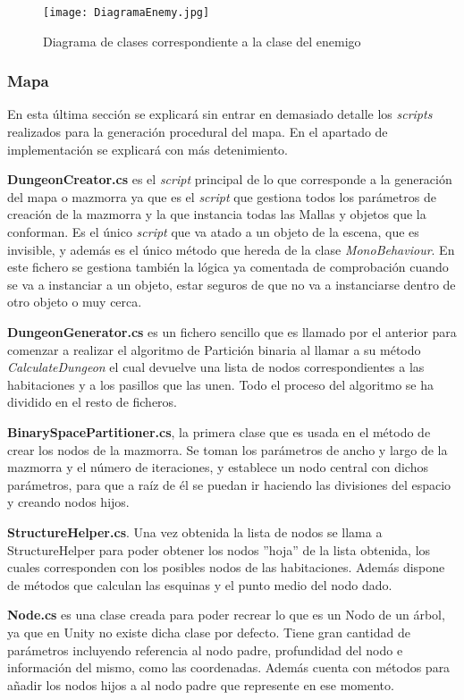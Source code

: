 \begin{figure}[H]
    \centering
    \texttt{[image: DiagramaEnemy.jpg]}
    \caption{Diagrama de clases correspondiente a la clase del enemigo}
\end{figure}

\subsubsection{Mapa}

En esta última sección se explicará sin entrar en demasiado detalle los \textit{scripts} realizados para la generación procedural del mapa. En el apartado de implementación se explicará con más detenimiento.

\textbf{DungeonCreator.cs} es el \textit{script} principal de lo que corresponde a la generación del mapa o mazmorra ya que es el \textit{script} que gestiona todos los parámetros de creación de la mazmorra y la que instancia todas las Mallas y objetos que la conforman. Es el único \textit{script} que va atado a un objeto de la escena, que es invisible, y además es el único método que hereda de la clase \textit{MonoBehaviour}. En este fichero se gestiona también la lógica ya comentada de comprobación cuando se va a instanciar a un objeto, estar seguros de que no va a instanciarse dentro de otro objeto o muy cerca.

\textbf{DungeonGenerator.cs} es un fichero sencillo que es llamado por el anterior para comenzar a realizar el algoritmo de Partición binaria al llamar a su método \textit{CalculateDungeon} el cual devuelve una lista de nodos correspondientes a las habitaciones y a los pasillos que las unen. Todo el proceso del algoritmo se ha dividido en el resto de ficheros.

\textbf{BinarySpacePartitioner.cs}, la primera clase que es usada en el método de crear los nodos de la mazmorra. Se toman los parámetros de ancho y largo de la mazmorra y el número de iteraciones, y establece un nodo central con dichos parámetros, para que a raíz de él se puedan ir haciendo las divisiones del espacio y creando nodos hijos.

\textbf{StructureHelper.cs}. Una vez obtenida la lista de nodos se llama a StructureHelper para poder obtener los nodos ''hoja'' de la lista obtenida, los cuales corresponden con los posibles nodos de las habitaciones. Además dispone de métodos que calculan las esquinas y el punto medio del nodo dado.

\textbf{Node.cs} es una clase creada para poder recrear lo que es un Nodo de un árbol, ya que en Unity no existe dicha clase por defecto. Tiene gran cantidad de parámetros incluyendo referencia al nodo padre, profundidad del nodo e información del mismo, como las coordenadas. Además cuenta con métodos para añadir los nodos hijos a al nodo padre que represente en ese momento. 

